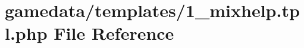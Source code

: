 \hypertarget{1__mixhelp_8tpl_8php}{\section{gamedata/templates/1\+\_\+mixhelp.tpl.\+php File Reference}
\label{1__mixhelp_8tpl_8php}
}
